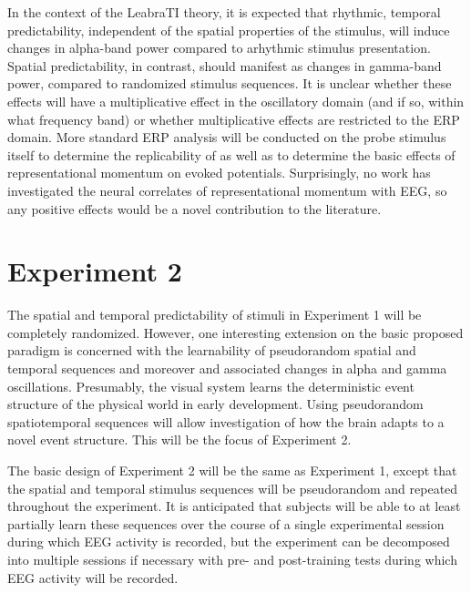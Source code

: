 \documentclass[defaultstyle,12pt]{thesis}
\begin{document}
{In the context of the LeabraTI theory, it is expected that rhythmic, temporal predictability, independent of the spatial properties of the stimulus, will induce changes in alpha-band power compared to arhythmic stimulus presentation. Spatial predictability, in contrast, should manifest as changes in gamma-band power, compared to randomized stimulus sequences. It is unclear whether these effects will have a multiplicative effect in the oscillatory domain (and if so, within what frequency band) or whether multiplicative effects are restricted to the ERP domain. More standard ERP analysis will be conducted on the probe stimulus itself to determine the replicability of  as well as to determine the basic effects of representational momentum on evoked potentials. Surprisingly, no work has investigated the neural correlates of representational momentum with EEG, so any positive effects would be a novel contribution to the literature.

\section{Experiment 2}
The spatial and temporal predictability of stimuli in Experiment 1 will be completely randomized. However, one interesting extension on the basic proposed paradigm is concerned with the learnability of pseudorandom spatial and temporal sequences and moreover and associated changes in alpha and gamma oscillations. Presumably, the visual system learns the deterministic event structure of the physical world in early development. Using pseudorandom spatiotemporal sequences will allow investigation of how the brain adapts to a novel event structure. This will be the focus of Experiment 2.

The basic design of Experiment 2 will be the same as Experiment 1, except that the spatial and temporal stimulus sequences will be pseudorandom and repeated throughout the experiment. It is anticipated that subjects will be able to at least partially learn these sequences over the course of a single experimental session during which EEG activity is recorded, but the experiment can be decomposed into multiple sessions if necessary with pre- and post-training tests during which EEG activity will be recorded. 

}
\end{document}
